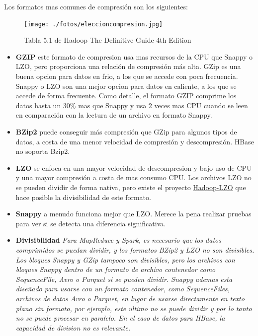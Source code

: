 \documentclass[a4paper,10pt]{article}
\begin{document}
Los formatos mas comunes de compresión son los siguientes:

\begin{figure}[H]
\centering
\texttt{[image: ./fotos/eleccioncompresion.jpg]}
\caption{Tabla 5.1 de Hadoop The Definitive Guide 4th Edition}
\end{figure}

\begin{itemize}

\item \textbf{GZIP} este formato de compresion usa mas recursos de la CPU que Snappy o LZO, pero proporciona una relación de compresión más alta. GZip es una buena opcion para datos en frio, a los que se accede con poca frecuencia. Snappy o LZO son una mejor opcion para datos en caliente, a los que se accede de forma frecuente. Como detalle, el formato GZIP comprime los datos hasta un 30\% mas que Snappy y usa 2 veces mas CPU cuando se leen en comparación con la lectura de un archivo en formato Snappy. 

\item \textbf{BZip2} puede conseguir más compresión que GZip para algunos tipos de datos, a costa de una menor velocidad de compresión y descompresión. HBase no soporta Bzip2.

\item \textbf{LZO} se enfoca en una mayor velocidad de descompresion y bajo uso de CPU y una mayor compresión a costa de mas consumo CPU. Los archivos LZO no se pueden dividir de forma nativa, pero existe el proyecto \href{https://www.anaconda.com/}{Hadoop-LZO} que hace posible la divisibilidad de este formato.

\item \textbf{Snappy} a menudo funciona mejor que LZO. Merece la pena realizar pruebas para ver si se detecta una diferencia significativa.

\item \textbf{Divisibilidad} \textit{Para MapReduce y Spark, es necesario que los datos comprimidos se puedan dividir, y los formatos BZip2 y LZO no son divisibles. Los bloques Snappy y GZip tampoco son divisibles, pero los archivos con bloques Snappy dentro de un formato de archivo contenedor como SequenceFile, Avro o Parquet si se pueden dividir. Snappy ademas esta diseñado para usarse con un formato contenedor, como SequenceFiles, archivos de datos Avro o Parquet, en lugar de usarse directamente en texto plano sin formato, por ejemplo, este ultimo no se puede dividir y por lo tanto no se puede procesar en paralelo. En el caso de datos para HBase, la capacidad de division no es relevante.}


\end{itemize}
\end{document}
